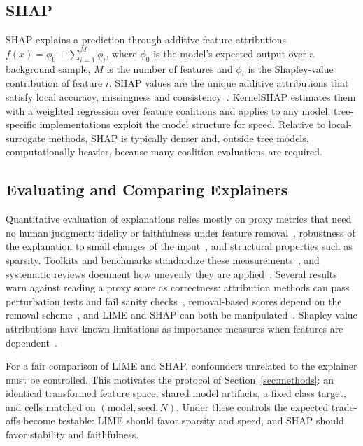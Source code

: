 \documentclass[11pt,a4paper]{article}
\begin{document}
\subsection{SHAP}

SHAP explains a prediction through additive feature attributions
$f(x) = \phi_0 + \sum_{i=1}^{M} \phi_i$, where $\phi_0$ is the model's
expected output over a background sample, $M$ is the number of features and
$\phi_i$ is the Shapley-value contribution of feature $i$. SHAP values are
the unique additive attributions that satisfy local accuracy, missingness
and consistency~\cite{lundberg2017unified}. KernelSHAP estimates them with
a weighted regression over feature coalitions and applies to any model;
tree-specific implementations exploit the model structure for speed.
Relative to local-surrogate methods, SHAP is typically denser and, outside
tree models, computationally heavier, because many coalition evaluations
are required.

\subsection{Evaluating and Comparing Explainers}

Quantitative evaluation of explanations relies mostly on proxy metrics that
need no human judgment: fidelity or faithfulness under feature
removal~\cite{bhatt2020evaluating,samek2017evaluating,hooker2019benchmark},
robustness of the explanation to small changes of the
input~\cite{alvarezmelis2018robustness}, and structural properties such as
sparsity. Toolkits and benchmarks standardize these
measurements~\cite{hedstrom2023quantus,agarwal2022openxai}, and systematic
reviews document how unevenly they are
applied~\cite{nauta2023anecdotal,canha2025benchmark}. Several results warn
against reading a proxy score as correctness: attribution methods can pass
perturbation tests and fail sanity checks~\cite{adebayo2018sanity},
removal-based scores depend on the removal
scheme~\cite{rong2022consistent}, and LIME and SHAP can both be
manipulated~\cite{slack2020fooling}. Shapley-value attributions have known
limitations as importance measures when features are
dependent~\cite{kumar2020problems}.

For a fair comparison of LIME and SHAP, confounders unrelated to the
explainer must be controlled. This motivates the protocol of
Section~\ref{sec:methods}: an identical transformed feature space, shared
model artifacts, a fixed class target, and cells matched on
$(\mathrm{model}, \mathrm{seed}, N)$. Under these controls the expected
trade-offs become testable: LIME should favor sparsity and speed, and SHAP
should favor stability and faithfulness.
\end{document}
